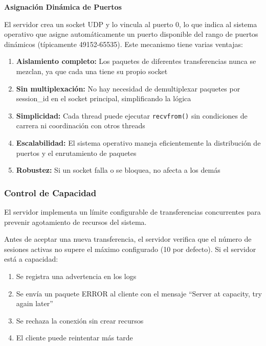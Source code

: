 \textbf{Asignación Dinámica de Puertos}

El servidor crea un socket UDP y lo vincula al puerto 0, lo que indica al sistema operativo que asigne automáticamente un puerto disponible del rango de puertos dinámicos (típicamente 49152-65535). Este mecanismo tiene varias ventajas:

\begin{enumerate}
    \item \textbf{Aislamiento completo:} Los paquetes de diferentes transferencias nunca se mezclan, ya que cada una tiene su propio socket

    \item \textbf{Sin multiplexación:} No hay necesidad de demultiplexar paquetes por session\_id en el socket principal, simplificando la lógica

    \item \textbf{Simplicidad:} Cada thread puede ejecutar \texttt{recvfrom()} sin condiciones de carrera ni coordinación con otros threads

    \item \textbf{Escalabilidad:} El sistema operativo maneja eficientemente la distribución de puertos y el enrutamiento de paquetes

    \item \textbf{Robustez:} Si un socket falla o se bloquea, no afecta a los demás
\end{enumerate}

\subsubsection{Control de Capacidad}

El servidor implementa un límite configurable de transferencias concurrentes para prevenir agotamiento de recursos del sistema.

Antes de aceptar una nueva transferencia, el servidor verifica que el número de sesiones activas no supere el máximo configurado (10 por defecto). Si el servidor está a capacidad:

\begin{enumerate}
    \item Se registra una advertencia en los logs
    \item Se envía un paquete ERROR al cliente con el mensaje ``Server at capacity, try again later''
    \item Se rechaza la conexión sin crear recursos
    \item El cliente puede reintentar más tarde
\end{enumerate}

